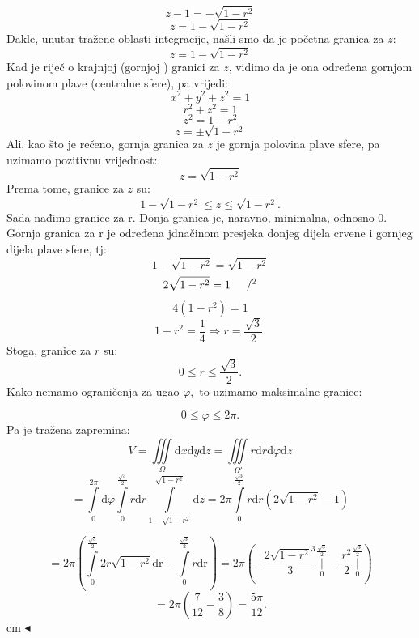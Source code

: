 \documentclass[a4paper,11pt]{article}
\begin{document}
$$z -1 = - \sqrt{1 - r^2}$$
$$z   = 1 - \sqrt{1 - r^2}$$
Dakle, unutar tražene oblasti integracije, našli smo da je početna granica za $z$:  
$$z   = 1 - \sqrt{1 - r^2}$$
Kad je riječ o krajnjoj (gornjoj ) granici za $z$, vidimo da je ona određena gornjom polovinom plave (centralne sfere), pa vrijedi:
$$x^2 + y^2 + z^2 = 1$$
$$r^2 + z^2 = 1$$
$$  z^2 = 1 - r^2$$
$$  z  =\pm \sqrt{ 1 - r^2}$$
 Ali, kao što je rečeno, gornja granica za $z$ je gornja polovina plave sfere, pa uzimamo pozitivnu vrijednost:
$$  z  =  \sqrt{ 1 - r^2}$$
Prema tome, granice za $z$ su:
$$1 - \sqrt{1 - r^2} \leq z \leq \sqrt{ 1 - r^2}. $$
Sada nađimo granice za r. Donja granica je, naravno, minimalna, odnosno 0. Gornja granica za r je određena jdnačinom presjeka donjeg dijela crvene i gornjeg dijela plave sfere, tj:
$$1 - \sqrt{1 - r^2} = \sqrt{ 1 - r^2}$$
$$2 \sqrt{ 1 - r^2} = 1 \hspace{0.5 cm}/^2$$
$$4(1-r^2) =1$$
$$1-r^2 = \frac{1}{4} \Rightarrow r = \frac{\sqrt{3}}{2}.$$
Stoga, granice za $r$ su:
$$0\leq r \leq \frac{\sqrt{3}}{2}.$$
Kako nemamo ograničenja za ugao $\varphi,$ to uzimamo maksimalne granice:

$$ 0\leq \varphi \leq 2\pi.$$
Pa je tražena zapremina:
$$V =\iiint \limits_{\Omega}    \mathrm dx \mathrm dy \mathrm dz = \iiint \limits_{\Omega'}    r \mathrm dr \mathrm d\varphi \mathrm dz $$
$$= \int\limits_{0}^{2\pi} \mathrm d\varphi \int\limits_{0}^{\frac{\sqrt{3}}{2}} r\mathrm dr \int\limits_{1 - \sqrt{1 - r^2}}^{  \sqrt{1 - r^2}}   \mathrm dz= 2\pi \int\limits_{0}^{\frac{\sqrt{3}}{2} } r\mathrm dr(2\sqrt{1 - r^2} -1)  $$

$$= 2\pi \left(\int\limits_{0}^{\frac{\sqrt{3}}{2} } 2r  \sqrt{1 - r^2} \mathrm{dr} - \int\limits_{0}^{\frac{\sqrt{3}}{2} }r\mathrm{dr} \right) = 2\pi \left(-\frac{2\sqrt{1-r^2}^{3}}{3}\underset{0}{\overset{ \frac{\sqrt{3}}{2} }{ \bigg\vert}}  - \frac{r^2}{2} \underset{0}{\overset{ \frac{\sqrt{3}}{2} }{ \bigg\vert}}\right) $$
$$= 2\pi \left(\frac{7}{12} - \frac{3}{8}\right) = \frac{5\pi}{12}.$$
 cm $\blacktriangleleft$ \\
\end{document}
